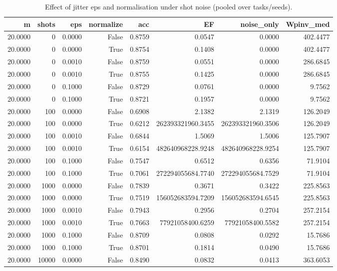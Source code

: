 \begin{table}
\caption{Effect of jitter eps and normalisation under shot noise (pooled over tasks/seeds).}
\label{tab:table5_noise_eps_normalize}
\begin{tabular}{rrrrrrrr}
\toprule
m & shots & eps & normalize & acc & EF & noise\_only & Wpinv\_med \\
\midrule
20.0000 & 0 & 0.0000 & False & 0.8759 & 0.0547 & 0.0000 & 402.4477 \\
20.0000 & 0 & 0.0000 & True & 0.8754 & 0.1408 & 0.0000 & 402.4477 \\
20.0000 & 0 & 0.0010 & False & 0.8759 & 0.0551 & 0.0000 & 286.6845 \\
20.0000 & 0 & 0.0010 & True & 0.8755 & 0.1425 & 0.0000 & 286.6845 \\
20.0000 & 0 & 0.1000 & False & 0.8729 & 0.0761 & 0.0000 & 9.7562 \\
20.0000 & 0 & 0.1000 & True & 0.8721 & 0.1957 & 0.0000 & 9.7562 \\
20.0000 & 100 & 0.0000 & False & 0.6908 & 2.1382 & 2.1319 & 126.2049 \\
20.0000 & 100 & 0.0000 & True & 0.6212 & 262393321960.3455 & 262393321960.3506 & 126.2049 \\
20.0000 & 100 & 0.0010 & False & 0.6844 & 1.5069 & 1.5006 & 125.7907 \\
20.0000 & 100 & 0.0010 & True & 0.6154 & 482640968228.9248 & 482640968228.9254 & 125.7907 \\
20.0000 & 100 & 0.1000 & False & 0.7547 & 0.6512 & 0.6356 & 71.9104 \\
20.0000 & 100 & 0.1000 & True & 0.7061 & 272294055684.7740 & 272294055684.7529 & 71.9104 \\
20.0000 & 1000 & 0.0000 & False & 0.7839 & 0.3671 & 0.3422 & 225.8563 \\
20.0000 & 1000 & 0.0000 & True & 0.7519 & 156052683594.7209 & 156052683594.6545 & 225.8563 \\
20.0000 & 1000 & 0.0010 & False & 0.7943 & 0.2956 & 0.2704 & 257.2154 \\
20.0000 & 1000 & 0.0010 & True & 0.7663 & 77921058400.6259 & 77921058400.5582 & 257.2154 \\
20.0000 & 1000 & 0.1000 & False & 0.8709 & 0.0808 & 0.0292 & 15.7686 \\
20.0000 & 1000 & 0.1000 & True & 0.8701 & 0.1814 & 0.0490 & 15.7686 \\
20.0000 & 10000 & 0.0000 & False & 0.8490 & 0.0832 & 0.0413 & 363.6053 \\

\end{tabular}
\end{table}
